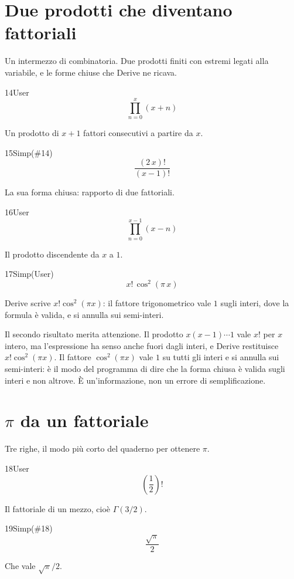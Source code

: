 \section{Due prodotti che diventano fattoriali}

Un intermezzo di combinatoria. Due prodotti finiti con estremi legati alla variabile, e le forme chiuse che Derive ne ricava.

\begin{espr}{14}{User}{}
\[
\prod_{n=0}^{x} \left(x + n\right)
\]
\end{espr}
Un prodotto di $x+1$ fattori consecutivi a partire da $x$.

\begin{espr}{15}{Simp(\#14)}{}
\[
\frac{\left(2\, x\right)!}{\left(x - 1\right)!}
\]
\end{espr}
La sua forma chiusa: rapporto di due fattoriali.

\begin{espr}{16}{User}{}
\[
\prod_{n=0}^{x - 1} \left(x - n\right)
\]
\end{espr}
Il prodotto discendente da $x$ a $1$.

\begin{espr}{17}{Simp(User)}{}
\[
x!\, \cos^{2}\!\left(\pi\, x\right)
\]
\end{espr}
Derive scrive $x!\cos^2(\pi x)$: il fattore trigonometrico vale $1$ sugli interi, dove la formula è valida, e si annulla sui semi-interi.


Il secondo risultato merita attenzione. Il prodotto $x(x-1)\cdots1$ vale $x!$ per $x$ intero, ma l'espressione ha senso anche fuori dagli interi, e Derive restituisce $x!\cos^2(\pi x)$. Il fattore $\cos^2(\pi x)$ vale $1$ su tutti gli interi e si annulla sui semi-interi: è il modo del programma di dire che la forma chiusa è valida sugli interi e non altrove. È un'informazione, non un errore di semplificazione.

\section{$\pi$ da un fattoriale}

Tre righe, il modo più corto del quaderno per ottenere $\pi$.

\begin{espr}{18}{User}{}
\[
\left(\frac{1}{2}\right)!
\]
\end{espr}
Il fattoriale di un mezzo, cioè $\Gamma(3/2)$.

\begin{espr}{19}{Simp(\#18)}{}
\[
\frac{\sqrt{\pi}}{2}
\]
\end{espr}
Che vale $\sqrt{\pi}/2$.

